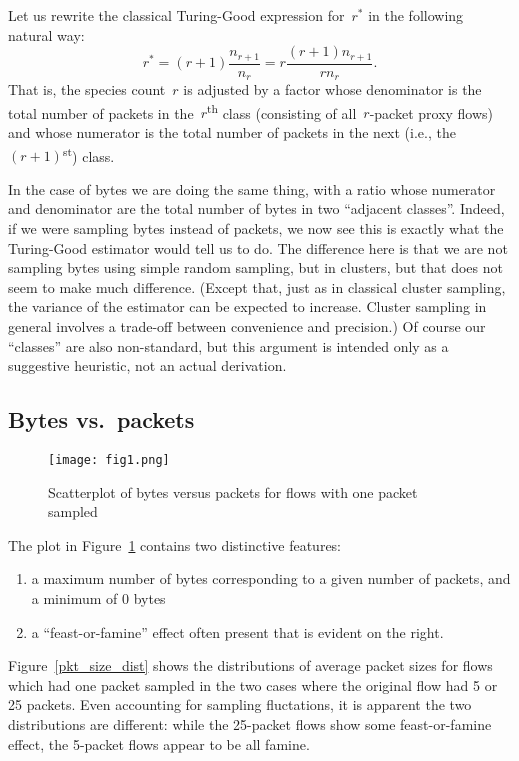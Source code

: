 \documentclass{paper}
\newcommand{\ts}{\textsuperscript}
\begin{document}
Let us rewrite the classical Turing-Good expression for~$r^*$ in the following
natural way:
$$ r^* =(r + 1) \frac{n_{r+1}}{n_r} = r \frac{(r+1)n_{r+1}}{rn_r}. $$
That is, the species count~$r$ is adjusted by a factor whose denominator is the
total number of packets in the~$r$\ts{th} class (consisting of all~$r$-packet proxy
flows) and whose numerator is the total number of packets in the next (i.e., the
$(r + 1)$\ts{st}) class.

In the case of bytes we are doing the same thing, with a ratio whose numerator
and denominator are the total number of bytes in two ``adjacent classes''.
Indeed, if we were sampling bytes instead of packets, we now see this is exactly
what the Turing-Good estimator would tell us to do. The difference here is that
we are not sampling bytes using simple random sampling, but in clusters, but
that does not seem to make much difference. (Except that, just as in classical
cluster sampling, the variance of the estimator can be expected to increase.
Cluster sampling in general involves a trade-off between convenience and
precision.) Of course our ``classes'' are also non-standard, but this argument
is intended only as a suggestive heuristic, not an actual derivation.

\subsection{Bytes vs.\ packets}

\begin{figure}[h]
\begin{center}
\texttt{[image: fig1.png]}
\caption{Scatterplot of bytes versus packets for flows with one packet sampled}
\label{pb_plot}
\end{center}
\end{figure}

The plot in Figure~\ref{pb_plot} contains two distinctive features:
\begin{enumerate}
  \item a maximum number of bytes corresponding to a given number of packets,
  and a minimum of 0 bytes
  \item a ``feast-or-famine'' effect often present that is evident on the
  right.
\end{enumerate}
Figure~\ref{pkt_size_dist} shows the distributions of average packet sizes for flows which
had one packet sampled in the two cases where the original flow had 5 or 25
packets. Even accounting for sampling fluctations, it is apparent the two
distributions are different: while the 25-packet flows show some feast-or-famine
effect, the 5-packet flows appear to be all famine.
\end{document}
